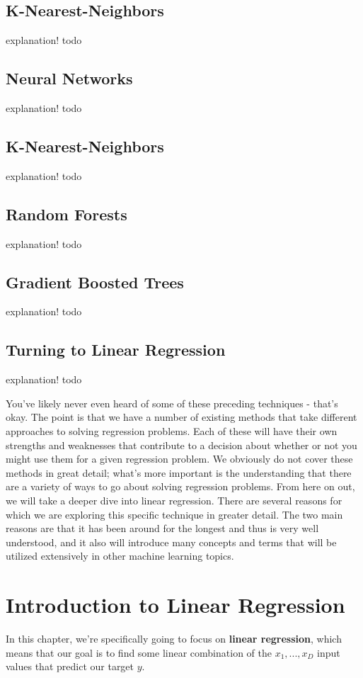 \subsection{K-Nearest-Neighbors}
explanation! todo

\subsection{Neural Networks}
explanation! todo

\subsection{K-Nearest-Neighbors}
explanation! todo

\subsection{Random Forests}
explanation! todo

\subsection{Gradient Boosted Trees}
explanation! todo

\subsection{Turning to Linear Regression}
explanation! todo

You've likely never even heard of some of these preceding techniques - that's okay. The point is that we have a number of existing methods that take different approaches to solving regression problems. Each of these will have their own strengths and weaknesses that contribute to a decision about whether or not you might use them for a given regression problem. We obviously do not cover these methods in great detail; what's more important is the understanding that there are a variety of ways to go about solving regression problems. From here on out, we will take a deeper dive into linear regression. There are several reasons for which we are exploring this specific technique in greater detail. The two main reasons are that it has been around for the longest and thus is very well understood, and it also will introduce many concepts and terms that will be utilized extensively in other machine learning topics.

\section{Introduction to Linear Regression}
In this chapter, we're specifically going to focus on \textbf{linear regression}, which means that our goal is to find some linear combination of the $x_{1}, ..., x_{D}$ input values that predict our target $y$.

